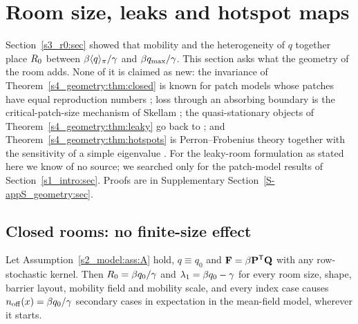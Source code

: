 \section{Room size, leaks and hotspot maps}\label{s4_geometry:sec}

Section~\ref{s3_r0:sec} showed that mobility and the heterogeneity of $q$ together place $R_0$ between
$\beta\langle q\rangle_{\pi}/\gamma$ and $\beta q_{\max}/\gamma$. This section asks what the geometry of the room adds. None of it
is claimed as new: the invariance of Theorem~\ref{s4_geometry:thm:closed} is known for patch models whose
patches have equal reproduction numbers \citep{gao2011sis}; loss through an absorbing boundary is the
critical-patch-size mechanism of Skellam \citep{skellam1951random,cantrell2003spatial}; the quasi-stationary
objects of Theorem~\ref{s4_geometry:thm:leaky} go back to \citet{darroch1967quasi}; and
Theorem~\ref{s4_geometry:thm:hotspots} is Perron--Frobenius theory together with the sensitivity of a simple
eigenvalue \citep{berman1994nonnegative,horn2013matrix}. For the leaky-room formulation as stated here we know
of no source; we searched only for the patch-model results of Section~\ref{s1_intro:sec}. Proofs are in
Supplementary Section~\ref{S-appS_geometry:sec}.

\subsection{Closed rooms: no finite-size effect}\label{s4_geometry:sec:closed}

\begin{theorem}\label{s4_geometry:thm:closed}
  Let Assumption~\ref{s2_model:ass:A} hold, $q\equiv q_0$ and $\mathbf{F}=\beta\mathbf{P}^{\mathsf{T}}\mathbf{Q}$ with any row-stochastic
  kernel. Then $R_0=\beta q_0/\gamma$ and $\lambda_1=\beta q_0-\gamma$ for every room size, shape, barrier
  layout, mobility field and mobility scale, and every index case causes $n_{\mathrm{off}}(x)=\beta q_0/\gamma$ secondary
  cases in expectation in the mean-field model, wherever it starts.
\end{theorem}

